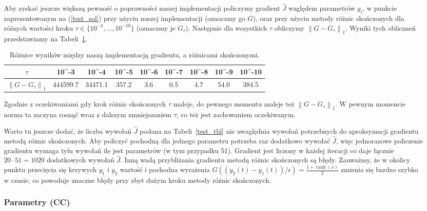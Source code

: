 \documentclass[11pt]{article}
\newcommand{\norm}[1]{\left\lVert#1\right\rVert}
\begin{document}
Aby zyskać jeszcze większą pewność o poprawności naszej implementacji policzymy gradient $\hat{J}$ względem parametrów $g_i$, w punkcie zaprezentowanym na (\ref{test_sol}) przy użyciu naszej implementacji (oznaczmy go $G$), oraz przy użyciu metody różnic skończonych dla różnych wartości kroku $\tau \in \{10^{-3},\ldots,10^{-10}\}$ (oznaczmy je $G_\tau$). Następnie dla wszystkich $\tau$ obliczymy $\norm{G - G_\tau}_1$. Wyniki tych obliczneń przedstawiamy na Tabeli~\ref{grad_fd_tbl}.

\begin{table}[h!]
  \begin{center}
    \begin{tabular}{|c|c|c|c|c|c|c|c|c|}
      \hline
      $\tau$ & 10^{-3} & 10^{-4} & 10^{-5} & 10^{-6} & 10^{-7} & 10^{-8} & 10^{-9} & 10^{-10} \\
      \hline
      $\norm{G - G_\tau}_1$ & 444599.7 & 34471.1 & 357.2 & 3.6 & 0.5 & 4.7 & 54.0 & 384.5 \\
      \hline
    \end{tabular}
    \caption{Różnice wyników między naszą implementacją gradientu, a różnicami skończonymi.}\label{grad_fd_tbl}
  \end{center}
\end{table}

Zgodnie z oczekiwaniami gdy krok różnic skończonych $\tau$ maleje, do pewnego momentu maleje też $\norm{G - G_\tau}_1$. W pewnym momencie norma ta zaczyna rosnąć wraz z dalszym zmniejszaniem $\tau$, co też jest zachowaniem oczekiwanym.

Warto tu jeszcze dodać, że liczba wywołań $\hat{J}$ podana na Tabeli~\ref{test_tbl} nie uwzględnia wywołań potrzebnych do aproksymacji gradientu metodą różnic skończonych. Aby policzyć pochodną dla jednego parametru potrzeba raz dodatkowo wywołać $\hat{J}$, więc jednorazowe policzenie gradientu wymaga tylu wywołań ile jest parametrów (w tym przypadku 51). Gradient jest liczony w każdej iteracji co daje łącznie $20\cdot 51 = 1020$ dodatkowych wywołań $\hat{J}$. Inną wadą przybliżania gradientu metodą różnic skończonych są błędy. Zauważmy, że w okolicy punktu przecięcia się krzywych $y_1$ i $y_2$ wartość i pochodna wyrażenia $G((y_2(t) - y_1(t))/\epsilon) = \frac{1 + \tanh(x)}{2}$ zmienia się bardzo szybko w czasie, co powoduje znaczne błędy przy zbyt dużym kroku metody różnic skończonych.

\subsubsection{Parametry (CC)}
\end{document}

